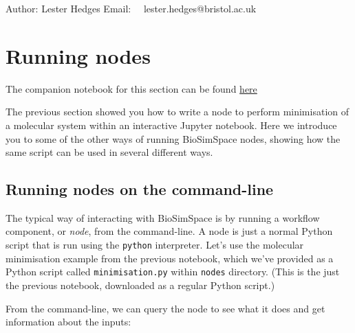 Author: Lester Hedges Email:~~ lester.hedges@bristol.ac.uk

\hypertarget{running-nodes}{%
\section{Running nodes}\label{running-nodes}}

The companion notebook for this section can be found
\href{https://github.com/michellab/BioSimSpaceTutorials/blob/4844562e7d2cd0b269cead56562ec16a3dfaef7c/01_introduction/05_running_nodes.ipynb}{here}

The previous section showed you how to write a node to perform
minimisation of a molecular system within an interactive Jupyter
notebook. Here we introduce you to some of the other ways of running
BioSimSpace nodes, showing how the same script can be used in several
different ways.

\hypertarget{running-nodes-on-the-command-line}{%
\subsection{Running nodes on the
command-line}\label{running-nodes-on-the-command-line}}

The typical way of interacting with BioSimSpace is by running a workflow
component, or \emph{node}, from the command-line. A node is just a
normal Python script that is run using the \texttt{python} interpreter.
Let's use the molecular minimisation example from the previous notebook,
which we've provided as a Python script called \texttt{minimisation.py}
within \texttt{nodes} directory. (This is the just the previous
notebook, downloaded as a regular Python script.)

From the command-line, we can query the node to see what it does and get
information about the inputs:

\begin{Shaded}
\begin{Highlighting}[]
\OperatorTok{/}\OperatorTok{--}
\end{Highlighting}
\end{Shaded}

